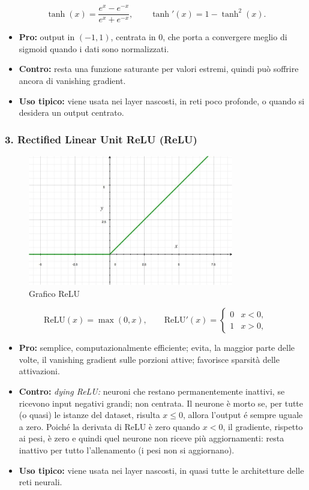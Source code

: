 \documentclass[a4paper,12pt]{report}
\begin{document}
	\[
	\tanh(x)=\frac{e^x-e^{-x}}{e^x+e^{-x}},\qquad
	\tanh'(x)=1-\tanh^2(x).
	\]
	\begin{itemize}
		\item \textbf{Pro:} output in $(-1,1)$, centrata in $0$, che porta a convergere meglio di sigmoid quando i dati sono normalizzati.
		\item \textbf{Contro:} resta una funzione saturante per valori estremi, quindi può soffrire ancora di vanishing gradient.
		\item \textbf{Uso tipico:} viene usata nei layer nascosti, in reti poco profonde, o quando si desidera un output centrato.
	\end{itemize}
	
	\subsubsection{3. Rectified Linear Unit ReLU (ReLU)}
	
	\begin{figure}[H]
		\centering
		\includegraphics[width=0.8\textwidth]{img/relu.png}
		\caption{Grafico ReLU}
	\end{figure}
	
	\[
	\mathrm{ReLU}(x)=\max(0,x),\qquad
	\mathrm{ReLU}'(x)=\begin{cases}0 & x<0,\\ 1 & x>0,\end{cases}
	\]
	\begin{itemize}
		\item \textbf{Pro:} semplice, computazionalmente efficiente; evita, la maggior parte delle volte, il vanishing gradient sulle porzioni attive; favorisce sparsità delle attivazioni.
		\item \textbf{Contro:} \emph{dying ReLU:} neuroni che restano permanentemente inattivi, se ricevono input negativi grandi; non centrata. Il neurone è morto se, per tutte (o quasi) le istanze del dataset, risulta $x\le0$, allora l’output é sempre uguale a zero. Poiché la derivata di ReLU è zero quando $x<0$, il gradiente, rispetto ai pesi, è zero e quindi quel neurone non riceve più aggiornamenti: resta inattivo per tutto l’allenamento (i pesi non si aggiornano).
		\item \textbf{Uso tipico:} viene usata nei layer nascosti, in quasi tutte le architetture delle reti neurali.
	\end{itemize}
	
\end{document}
